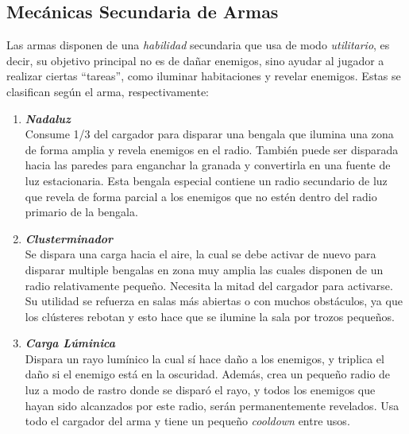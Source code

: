     \subsection{Mecánicas Secundaria de Armas} \label{mecanicasSecundarias}
        Las armas disponen de una \textit{habilidad} secundaria que usa de modo \textit{utilitario}, es decir, su objetivo principal no es de dañar enemigos, sino ayudar al jugador a realizar ciertas “tareas”, como iluminar habitaciones y revelar enemigos.
        Estas se clasifican según el arma, respectivamente:
        \begin{enumerate}
            \item \textbf{\textit{Nadaluz}} \\
                Consume 1/3 del cargador para disparar una bengala que ilumina una zona de forma amplia y revela enemigos en el radio. También puede ser disparada hacia las paredes para enganchar la granada y convertirla en una fuente de luz estacionaria.
                Esta bengala especial contiene un radio secundario de luz que revela de forma parcial a los enemigos que no estén dentro del radio primario de la bengala.
            \item \textbf{\textit{Clusterminador}} \\
                Se dispara una carga hacia el aire, la cual se debe activar de nuevo para disparar multiple bengalas en zona muy amplia las cuales disponen de un radio relativamente pequeño. Necesita la mitad del cargador para activarse.
                Su utilidad se refuerza en salas más abiertas o con muchos obstáculos, ya que los clústeres rebotan y esto hace que se ilumine la sala por trozos pequeños.
            \item \textbf{\textit{Carga Lúminica}} \\
                Dispara un rayo lumínico la cual sí hace daño a los enemigos, y triplica el daño si el enemigo está en la oscuridad. Además, crea un pequeño radio de luz a modo de rastro donde se disparó el rayo, y todos los enemigos que hayan sido alcanzados por este radio, serán permanentemente revelados.
                Usa todo el cargador del arma y tiene un pequeño \textit{cooldown} entre usos.
        \end{enumerate}

